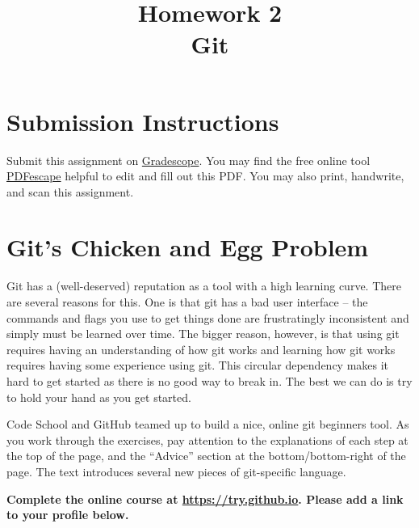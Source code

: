 \documentclass{article}
\begin{document}
\fancyhead[L]{}
\fancyhead[R]{}

\fancyfoot[C]{\thepage~/~\pageref*{LastPage}}
\pagestyle{fancyplain}


\title{\textbf{Homework 2\\Git}}
\author{\textbf{\color{red}{Due: Saturday, January 21, 10:00PM (Hard Deadline)}}}
\date{}
\maketitle


\section*{Submission Instructions}
Submit this assignment on \href{https://gradescope.com/courses/5574}{Gradescope}.
You may find the free online tool \href{https://www.pdfescape.com}{PDFescape}
helpful to edit and fill out this PDF.
You may also print, handwrite, and scan this assignment.

\section{Git's Chicken and Egg Problem}

Git has a (well-deserved) reputation as a tool with a high learning curve.
There are several reasons for this. One is that git has a bad user interface
-- the commands and flags you use to get things done are frustratingly
inconsistent and simply must be learned over time.
The bigger reason, however, is that using git requires having an understanding
of how git works and learning how git works requires having some experience
using git. This circular dependency makes it hard to get started as there is
no good way to break in. The best we can do is try to hold your hand as you
get started.

\medskip
\noindent
Code School and GitHub teamed up to build a nice, online git beginners tool.
As you work through the exercises, pay attention to the explanations of each
step at the top of the page, and the ``Advice'' section at the
bottom/bottom-right of the page. The text introduces several new pieces of
git-specific language.

\medskip
\noindent
\textbf{Complete the online course at \url{https://try.github.io}. Please add
a link  to your profile below.
  \color{red}{\small (You will need to sign in or create an account get your badge)}
}
\end{document}
